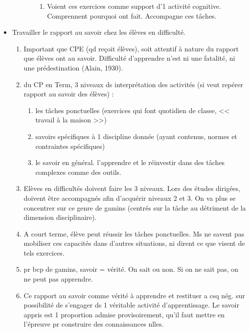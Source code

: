 \documentclass[12pt]{report}
\begin{document}
\begin{itemize}
\begin{enumerate}
\begin{enumerate}
\begin{enumerate}
\item Voient ces exercices comme support d'1 activité cognitive. Comprennent pourquoi ont fait. Accompagne ces tâches.\\
\end{enumerate}
\end{enumerate}
\end{enumerate}

\item Travailler le rapport au savoir chez les élèves en difficulté.

\begin{enumerate}
\item Important que CPE (qd reçoit élèves), soit attentif à nature du rapport que élèves ont au savoir. Difficulté d'apprendre n'est ni une fatalité, ni une prédestination (Alain, 1930). \\
\item du CP en Term, 3 niveaux ds interprétation des activités (si veut repérer rapport au savoir des élèves) : \\
\begin{enumerate}
\item les tâches ponctuelles (exercices qui font quotidien de classe, << travail à la maison >>) \\
\item savoirs spécifiques à 1 discipline donnée (ayant contenus, normes et contraintes spécifiques)\\
\item le savoir en général. l'apprendre et le réinvestir dans des tâches complexes comme des outils. \\
\end{enumerate}

\item Elèves en difficultés doivent faire les 3 niveaux. Lors des études dirigées, doivent être accompagnés afin d'acquérir niveaux 2 et 3. On va plus se concentrer sur ce genre de gamins (centrés sur la tâche au détriment de la dimension disciplinaire).\\
\item A court terme, élève peut réussir les tâches ponctuelles. Ms ne savent pas mobiliser ces capacités dans d'autres situations, ni dirent ce que visent de tels exercices.\\
\item pr bcp de gamins, savoir = vérité. On sait ou non. Si on ne sait pas, on ne peut pas apprendre.\\
\item Ce rapport au savoir comme vérité à apprendre et restituer a csq nég. sur possibilité de s'engager ds 1 véritable activité d'apprentissage. Le savoir appris est 1 proportion admise provisoirement, qu'il faut mettre en l'épreuve pr construire des connaissances nlles.\\


\end{enumerate}
\end{itemize}
\end{document}
